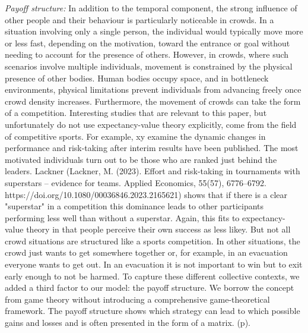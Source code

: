 \documentclass[pdflatex,sn-mathphys-num]{sn-jnl}%
\theoremstyle{thmstyleone}%
\theoremstyle{thmstyletwo}%
\theoremstyle{thmstylethree}%
\begin{document}
\textit{Payoff structure:}
In addition to the temporal component, the strong influence of other people and their behaviour is particularly noticeable in crowds. In a situation involving only a single person, the individual would typically move more or less fast, depending on the motivation, toward the entrance or goal without needing to account for the presence of others. However, in crowds, where such scenarios involve multiple individuals, movement is constrained by the physical presence of other bodies. Human bodies occupy space, and in bottleneck environments, physical limitations prevent individuals from advancing freely once crowd density increases. Furthermore, the movement of crowds can take the form of a competition. Interesting studies that are relevant to this paper, but unfortunately do not use expectancy-value theory explicitly, come from the field of competitive sports. For example, xy examine the dynamic changes in performance and risk-taking after interim results have been published. The most motivated individuals turn out to be those who are ranked just behind the leaders. Lackner (Lackner, M. (2023). Effort and risk-taking in tournaments with superstars – evidence for teams. Applied Economics, 55(57), 6776–6792. https://doi.org/10.1080/00036846.2023.2165621) shows that if there is a clear "superstar" in a competition this dominance leads to other participants performing less well than without a superstar. Again, this fits to expectancy-value theory in that people perceive their own success as less likey. But not all crowd situations are structured like a sports competition. In other situations, the crowd just wants to get somewhere together or, for example, in an evacuation everyone wants to get out. In an evacuation it is not important to win but to exit early enough to not be harmed. To capture these different collective contexts, we added a third factor to our model: the payoff structure. We borrow the concept from game theory without introducing a comprehensive game-theoretical framework. The payoff structure shows which strategy can lead to which possible gains and losses and is often presented in the form of a matrix.  (p). 
\end{document}
